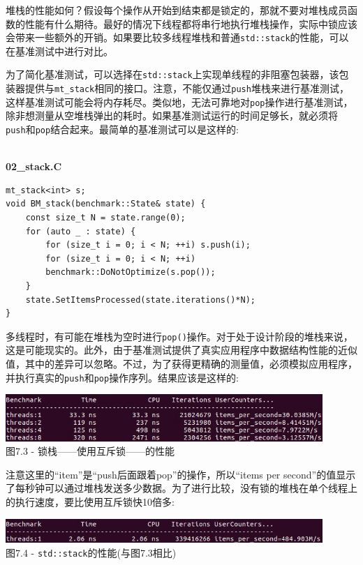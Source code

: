 堆栈的性能如何？假设每个操作从开始到结束都是锁定的，那就不要对堆栈成员函数的性能有什么期待。最好的情况下线程都将串行地执行堆栈操作，实际中锁应该会带来一些额外的开销。如果要比较多线程堆栈和普通\texttt{std::stack}的性能，可以在基准测试中进行对比。

为了简化基准测试，可以选择在\texttt{std::stack}上实现单线程的非阻塞包装器，该包装器提供与\texttt{mt\_stack}相同的接口。注意，不能仅通过\texttt{push}堆栈来进行基准测试，这样基准测试可能会将内存耗尽。类似地，无法可靠地对\texttt{pop}操作进行基准测试，除非想测量从空堆栈弹出的耗时。如果基准测试运行的时间足够长，就必须将\texttt{push}和\texttt{pop}结合起来。最简单的基准测试可以是这样的:

\hspace*{\fill} \\ %
\noindent
\textbf{02\_stack.C}
\begin{lstlisting}[style=styleCXX]
mt_stack<int> s;
void BM_stack(benchmark::State& state) {
	const size_t N = state.range(0);
	for (auto _ : state) {
		for (size_t i = 0; i < N; ++i) s.push(i);
		for (size_t i = 0; i < N; ++i)
		benchmark::DoNotOptimize(s.pop());
	}
	state.SetItemsProcessed(state.iterations()*N);
}
\end{lstlisting}

多线程时，有可能在堆栈为空时进行\texttt{pop()}操作。对于处于设计阶段的堆栈来说，这是可能现实的。此外，由于基准测试提供了真实应用程序中数据结构性能的近似值，其中的差异可以忽略。不过，为了获得更精确的测量值，必须模拟应用程序，并执行真实的\texttt{push}和\texttt{pop}操作序列。结果应该是这样的:

\begin{center}
\includegraphics[width=0.9\textwidth]{content/2/chapter7/images/3.jpg}\\
图7.3 - 锁栈——使用互斥锁——的性能
\end{center}

注意这里的“item”是“push后面跟着pop”的操作，所以“items per second”的值显示了每秒钟可以通过堆栈发送多少数据。为了进行比较，没有锁的堆栈在单个线程上的执行速度，要比使用互斥锁快10倍多:

\begin{center}
\includegraphics[width=0.9\textwidth]{content/2/chapter7/images/4.jpg}\\
图7.4 - \texttt{std::stack}的性能(与图7.3相比)
\end{center}

